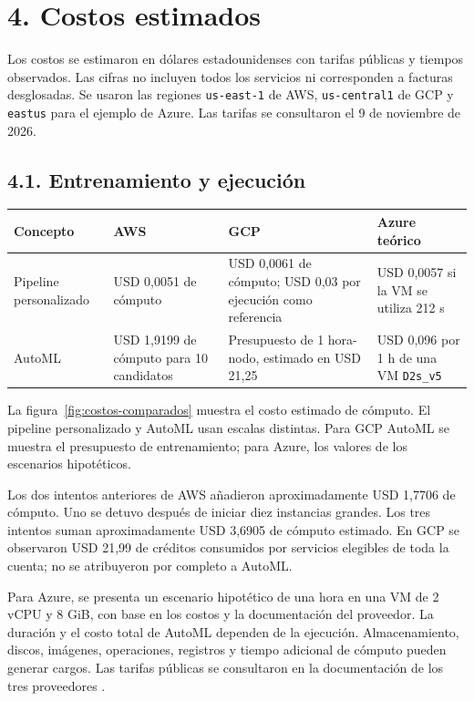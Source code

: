 \section{4. Costos estimados}

Los costos se estimaron en dólares estadounidenses con tarifas públicas y tiempos observados. Las cifras no incluyen todos los servicios ni corresponden a facturas desglosadas. Se usaron las regiones \texttt{us-east-1} de AWS, \texttt{us-central1} de GCP y \texttt{eastus} para el ejemplo de Azure. Las tarifas se consultaron el 9 de noviembre de 2026.

\subsection{4.1. Entrenamiento y ejecución}

\begin{fullwidth}\small
\setlength{\tabcolsep}{5pt}\renewcommand{\arraystretch}{1.2}
\begin{tabularx}{\linewidth}{@{}lXXX@{}}
\toprule
\textbf{Concepto} & \textbf{AWS} & \textbf{GCP} & \textbf{Azure teórico} \\
\midrule
Pipeline personalizado & USD 0,0051 de cómputo & USD 0,0061 de cómputo; USD 0,03 por ejecución como referencia & USD 0,0057 si la VM se utiliza 212 s \\
AutoML & USD 1,9199 de cómputo para 10 candidatos & Presupuesto de 1 hora-nodo, estimado en USD 21,25 & USD 0,096 por 1 h de una VM \texttt{D2s\_v5} \\
\bottomrule
\end{tabularx}
\end{fullwidth}

La figura~\ref{fig:costos-comparados} muestra el costo estimado de cómputo. El pipeline personalizado y AutoML usan escalas distintas. Para GCP AutoML se muestra el presupuesto de entrenamiento; para Azure, los valores de los escenarios hipotéticos.


Los dos intentos anteriores de AWS añadieron aproximadamente USD 1,7706 de cómputo. Uno se detuvo después de iniciar diez instancias grandes. Los tres intentos suman aproximadamente USD 3,6905 de cómputo estimado. En GCP se observaron USD 21,99 de créditos consumidos por servicios elegibles de toda la cuenta; no se atribuyeron por completo a AutoML.

Para Azure, se presenta un escenario hipotético de una hora en una VM de 2 vCPU y 8 GiB, con base en los costos y la documentación del proveedor. La duración y el costo total de AutoML dependen de la ejecución. Almacenamiento, discos, imágenes, operaciones, registros y tiempo adicional de cómputo pueden generar cargos. Las tarifas públicas se consultaron en la documentación de los tres proveedores \cite{aws-precios,gcp-precios,azure-precios}.

